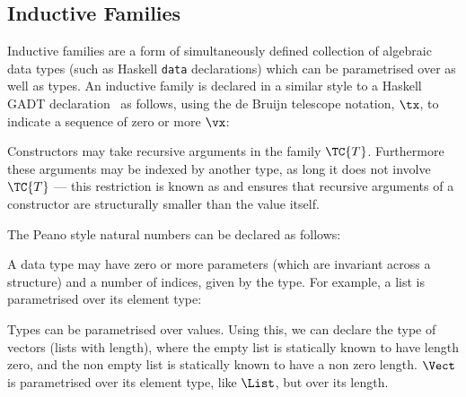 \subsection{Inductive Families}

\label{indfamilies}

Inductive families \cite{dybjer94} are a form of simultaneously
defined collection of algebraic data types (such as Haskell
\texttt{data} declarations) which can be parametrised over
 as well as types.  An inductive family is declared
in a similar style to a Haskell GADT declaration~\cite{gadts}
as
follows, using the de Bruijn telescope notation, $\tx$, to indicate a
sequence of zero or more $\vx$:


Constructors may take recursive arguments in the family
$\TC{T}$. Furthermore these arguments may be indexed by another type,
as long it does not involve $\TC{T}$ --- this restriction is known as
 and ensures that recursive arguments of a
constructor are structurally smaller than the value itself.

The Peano style natural numbers can be declared as follows:

\DM{
\Data\:\Nat\Hab\Type\hg\Where\hg\Z\Hab\Nat\:\mid\:\suc\Hab\fbind{\vk}{\Nat}{\Nat}
}

A data type may have zero or more parameters (which are invariant
across a structure) and a number of indices, given by the type. For
example, a list is parametrised over its element type:

\DM{
\AR{
\Data\:\List\:(\vA\Hab\Type)\Hab\Type\hg\Where
\ARd{
& \nil\Hab\List\:\vA\\
\mid & \cons\Hab\fbind{\vx}{\vA}{\fbind{\vxs}{\List\:\vA}{\List\:\vA}}
}
}
}

Types can be
parametrised over values. Using this, we can declare the type of
vectors (lists with length), where the empty list is statically known
to have length zero, and the non empty list is statically known to
have a non zero length. $\Vect$ is parametrised over its element type,
like $\List$, but  over its length.

\DM{
\AR{
\Data\:\Vect\:(\vA\Hab\Type)\Hab\Nat\to\Type\hg\Where \\
\hg\hg\ARd{
& \Vnil\Hab\Vect\:\vA\:\Z\\
\mid & \Vcons\Hab\fbind{\vk}{\Nat}{
\fbind{\vx}{\vA}{\fbind{\vxs}{\Vect\:\vA\:\vk}{\Vect\:\vA\:(\suc\:\vk)}}
}
}
}
}

